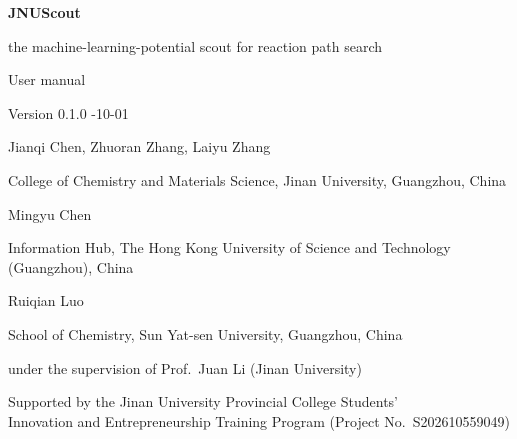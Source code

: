 \documentclass[11pt,a4paper,oneside,numbers=noenddot,listof=totoc]{scrreprt}
\begin{document}
\begin{titlepage}
  \centering
  \vspace*{2.5cm}
  {\sffamily\Huge\bfseries JNUScout\par}
  \vspace{0.6cm}
  {\Large the machine-learning-potential scout for reaction path search\par}
  \vspace{0.4cm}
  {\large User manual\par}
  \vspace{1.6cm}
  {\large Version 0.1.0 \quad\textbullet{}-10-01\par}
  \vfill
  {\large
  Jianqi Chen, Zhuoran Zhang, Laiyu Zhang\par
  \small College of Chemistry and Materials Science, Jinan University, Guangzhou, China\par
  \vspace{0.4cm}
  \large Mingyu Chen\par
  \small Information Hub, The Hong Kong University of Science and Technology (Guangzhou), China\par
  \vspace{0.4cm}
  \large Ruiqian Luo\par
  \small School of Chemistry, Sun Yat-sen University, Guangzhou, China\par
  \vspace{0.8cm}
  \normalsize under the supervision of Prof.\ Juan Li (Jinan University)\par
  }
  \vfill
  {\small Supported by the Jinan University Provincial College Students'\\
  Innovation and Entrepreneurship Training Program (Project No.\ S202610559049)\par}
  \vspace{1cm}
\end{titlepage}

\tableofcontents














\appendix




\printbibliography[heading=bibintoc]
\printindex
\end{document}
